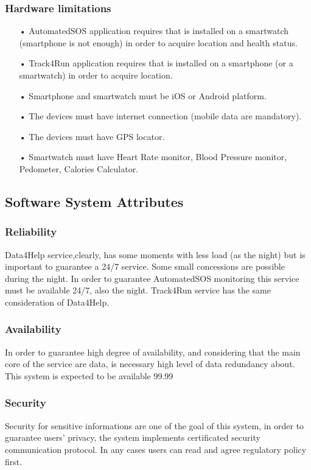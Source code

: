 \subsubsection{Hardware limitations}
\begin{enumerate} 
\item[•] AutomatedSOS application requires that is installed on a smartwatch (smartphone is not enough) in order to acquire location and health status.
\item[•] Track4Run application requires that is installed on a smartphone (or a smartwatch) in order to acquire location.
\item[•] Smartphone and smartwatch must be iOS or Android platform.
\item[•] The devices must have internet connection (mobile data are mandatory).
\item[•] The devices must have GPS locator.
\item[•] Smartwatch must have Heart Rate monitor, Blood Pressure monitor, Pedometer, Calories Calculator.
\end{enumerate}

\subsection{Software System Attributes}
\subsubsection{Reliability}
Data4Help service,clearly, has some moments with less load (as the night) but is important to guarantee a 24/7 service. Some small concessions are possible during the night.
In order to guarantee AutomatedSOS monitoring this service must be available 24/7, also the night.
Track4Run service has the same consideration of Data4Help.
\subsubsection{Availability}
In order to guarantee high degree of availability, and considering that the main core of the service are data, is necessary high level of data redundancy about.
This system is expected to be available 99.99%
\subsubsection{Security}
Security for sensitive informations are one of the goal of this system, in order to guarantee users' privacy, the system implements certificated security communication protocol.
In any cases users can read and agree regulatory policy first.
